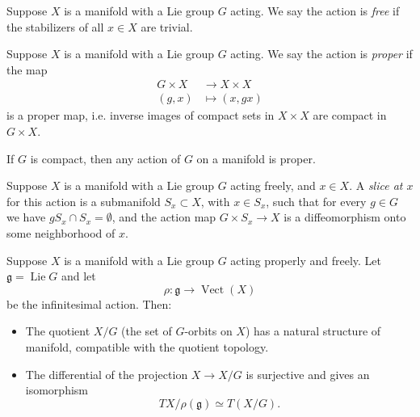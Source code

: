 \documentclass[12pt,letterpaper,reqno]{article}
\numberwithin{equation}{section}
\newcommand{\fg}{{\mathfrak g}}
\newcommand{\ti}[1]{\textit{#1}}
\DeclareMathOperator{\Lie}{Lie}
\DeclareMathOperator{\Vect}{Vect}
\newcommand{\insfig}[2]{

\medskip
\noindent
\begin{minipage}{\linewidth}

\makebox[\linewidth]{\texttt{[image: figures/\#1-crop.pdf]}}

\end{minipage}
\medskip

}
\begin{document}
\begin{defn} \label{def:free} Suppose $X$ is a manifold
with a Lie group $G$ acting. We say the action is \ti{free} if
the stabilizers of all $x \in X$ are trivial.
\end{defn}

\begin{defn} \label{def:proper}
Suppose $X$ is a manifold
with a Lie group $G$ acting. We say the action is \ti{proper} if
the map 
\begin{align}
  G \times X &\to X \times X \\
  (g,x) &\mapsto (x, gx) 
\end{align}
is a proper map, i.e.
inverse images of compact sets in $X \times X$
are compact in $G \times X$.
\end{defn}

\begin{prop}
If $G$ is compact, then any action of $G$ on a manifold is proper.
\end{prop}

\begin{defn}[Slice] \label{def:slice}
Suppose $X$ is a manifold with a Lie group $G$ acting freely,
and $x \in X$.
A \ti{slice at $x$} for this action is a
submanifold $S_x \subset X$, with $x \in S_x$,
such that for every $g \in G$ we have $g S_x \cap S_x = \emptyset$,
and the action map $G \times S_x \to X$ is a diffeomorphism
onto some neighborhood of $x$.
\end{defn}

\insfig{higgs-bundles-10}{1.1}

\begin{prop} \label{prop:free-proper-quotients-are-manifolds}
Suppose $X$ is a manifold with a Lie group $G$
acting properly and freely.
Let $\fg = \Lie G$ and let
\begin{equation}
\rho: \fg \to \Vect(X)
\end{equation}
be the infinitesimal action.
Then:
\begin{itemize}
\item The quotient $X / G$ (the set of $G$-orbits on $X$)
has a natural structure of manifold, compatible with
the quotient topology.
\item The differential of the projection $X \to X/G$
is surjective and gives an isomorphism
\begin{equation}
TX / \rho(\fg) \simeq T(X/G).
\end{equation}
\end{itemize}
\end{prop}
\end{document}
